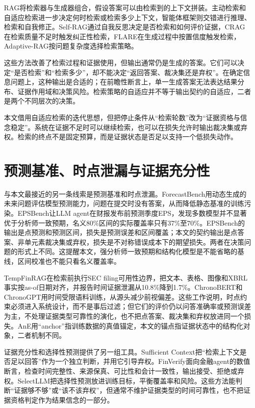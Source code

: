 RAG将检索器与生成器组合，假设答案可以由检索到的上下文拼装\citep{lewis2020rag}。主动检索和自适应检索进一步决定何时检索或检索多少上下文\citep{jiang2023flare,jeong2024adaptiverag}，智能体框架则交错进行推理、检索和自我修正\citep{yao2023react,shinn2023reflexion}。Self-RAG通过自我反思决定是否检索和如何评价证据\citep{asai2024selfrag}，CRAG在检索质量不足时触发纠正性检索\citep{yan2024crag}，FLARE在生成过程中按置信度触发检索\citep{jiang2023flare}，Adaptive-RAG按问题复杂度选择检索策略\citep{jeong2024adaptiverag}。

这些方法改善了检索过程和证据使用，但输出通常仍是生成的答案。它们可以决定“是否检索”和“检索多少”，却不能决定“返回答案、裁决集还是弃权”。在确定信息问题上，这种输出是合适的；在前瞻性断言上，单一生成答案无法表达结果分布、证据作用域和决策风险。检索策略的自适应并不等于输出契约的自适应，二者是两个不同层次的决策。

本文借用自适应检索的迭代思想，但把停止条件从“检索轮数”改为“证据资格与信念稳定”。系统在证据不足时可以继续检索，也可以在损失允许时输出裁决集或弃权。检索的终点不是固定预算，而是证据状态是否足以支持一个低损失动作。

\section{预测基准、时点泄漏与证据充分性}

与本文最接近的另一条线索是预测基准和时点泄漏。ForecastBench用动态生成的未来问题评估模型预测能力，问题在提交时没有答案，从而降低静态基准的训练污染\citep{karger2025forecastbench}。EPSBench让LLM agent在财报发布前预测季度EPS，发现多数模型并不显著优于分析师一致预期，名义80\%区间的实际覆盖率只有37\%至70\%\citep{yin2026epsbench}。EPSBench的输出是点预测和预测区间，损失是预测误差和区间覆盖；本文的契约输出是点答案、非单元素裁决集或弃权，损失是不对称错误成本下的期望损失。两者在决策问题的形式上不同。这提醒本文，强分析师一致预期和结构化模型是不能省略的基线，区间校准也不能只看名义覆盖率。

TempFinRAG在检索前执行SEC filing可用性边界，把文本、表格、图像和XBRL事实按as-of日期对齐，并报告时间证据泄漏从10.8\%降到1.7\%\citep{tao2026tempfinrag}。ChronoBERT和ChronoGPT用时间受限语料训练，从源头减少前视偏差\citep{he2026chrono}。这些工作说明，时点约束必须进入系统设计，而不是事后过滤；但它们的评价仍以问答准确率或预测误差为主，不处理证据类型可靠性的演化，也不把点答案、裁决集和弃权放进同一个损失。AnE用“anchor”指训练数据的真值锚定，本文的锚点指证据状态中的结构化对象，二者机制不同\citep{wang2026ane}。

证据充分性和选择性预测提供了另一组工具。Sufficient Context把“检索上下文是否足以回答”作为一个独立判断，并用它引导弃权\citep{joren2025sufficient}。FinVerify面向金融agent的数值断言，检查时间完整性、来源保真、可比性和会计一致性，输出接受、拒绝或弃权\citep{guan2026finverify}。SelectLLM把选择性预测放进训练目标，平衡覆盖率和风险\citep{mao2025selectllm}。这些方法能判断“证据够不够”或“该不该弃权”，但通常不维护证据类型的时间可靠性，也不把证据资格判定作为结果信念的一部分。


